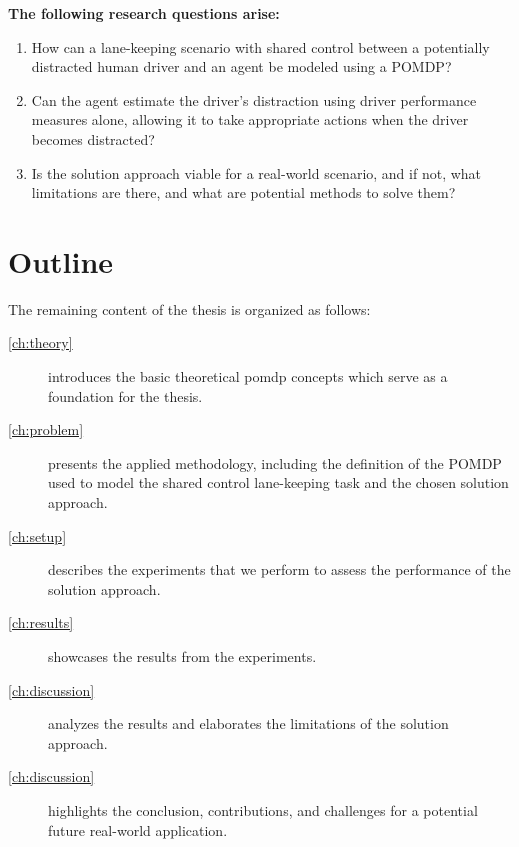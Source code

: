 \vspace{1em}
\noindent
\textbf{The following research questions arise:}
\begin{enumerate}
    \item How can a lane-keeping scenario with shared control between a potentially distracted human driver and an agent be modeled using a POMDP?
    \item Can the agent estimate the driver's distraction using driver performance measures alone, allowing it to take appropriate actions when the driver becomes distracted?
    \item Is the solution approach viable for a real-world scenario, and if not, what limitations are there, and what are potential methods to solve them?
\end{enumerate}

\section{Outline}

The remaining content of the thesis is organized as follows:
\begin{description}
    \item[\cref{ch:theory}] introduces the basic theoretical \gls{pomdp} concepts which serve as a foundation for the thesis.

    \item[\cref{ch:problem}]
    presents the applied methodology, including the definition of the POMDP used to model the shared control lane-keeping task and the chosen solution approach.
    
    \item[\cref{ch:setup}]
    describes the experiments that we perform to assess the performance of the solution approach.
    
    \item[\cref{ch:results}]
    showcases the results from the experiments.

    \item[\cref{ch:discussion}]
    analyzes the results and elaborates the limitations of the solution approach.

    \item[\cref{ch:discussion}]
    highlights the conclusion, contributions, and challenges for a potential future real-world application.

\end{description}